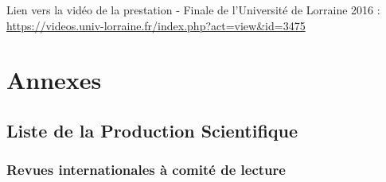 \documentclass[
  12pt,
  oneside]{book}
\begin{document}
Lien vers la vidéo de la prestation - Finale de l'Université de Lorraine 2016 :
\url{https://videos.univ-lorraine.fr/index.php?act=view&id=3475}

\newpage

\appendix

\hypertarget{annexes}{%
\chapter*{Annexes}\label{annexes}}

\renewcommand{\thesection}{\Alph{section}}

\hypertarget{articles}{%
\section{Liste de la Production Scientifique}\label{articles}}

\hypertarget{revues-internationales-uxe0-comituxe9-de-lecture}{%
\subsection{Revues internationales à comité de lecture}\label{revues-internationales-uxe0-comituxe9-de-lecture}}
\end{document}
